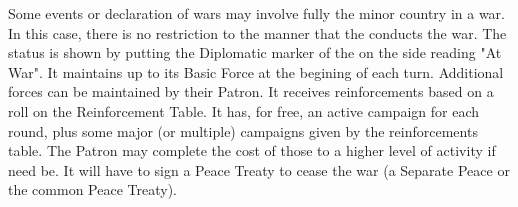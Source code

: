 \label{chDiplo:Entry War Minor}
Some events or declaration of wars may involve fully the minor country in a
war.
\bparag In this case, there is no restriction to the manner that the \MIN
conducts the war. The status is shown by putting the Diplomatic marker of the
\MIN on the side reading "At War".
\bparag It maintains up to its Basic Force at the begining of each turn.
Additional forces can be maintained by their Patron.
\bparag It receives reinforcements based on a roll on the Reinforcement Table.
It has, for free, an active campaign for each round, plus some major (or
multiple) campaigns given by the reinforcements table. The Patron may complete
the cost of those to a higher level of activity if need be.
\bparag It will have to sign a Peace Treaty to cease the war (a Separate Peace
or the common Peace Treaty).



